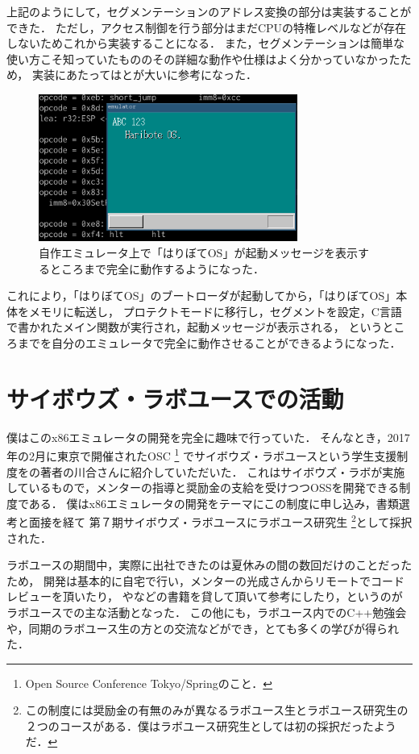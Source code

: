 \documentclass[10pt,a4j]{jsarticle}
\begin{document}
上記のようにして，セグメンテーションのアドレス変換の部分は実装することができた．
ただし，アクセス制御を行う部分はまだCPUの特権レベルなどが存在しないためこれから実装することになる．
また，セグメンテーションは簡単な使い方こそ知っていたもののその詳細な動作や仕様はよく分かっていなかったため，
実装にあたっては\cite[はじめて読む486]{read-486}と\cite[SDM]{SDM}が大いに参考になった．

\begin{figure}
	\vspace{-7mm}
	\caption{自作エミュレータ上で「はりぼてOS」が起動メッセージを表示するところまで完全に動作するようになった．}
	\includegraphics[width=85mm]{emu.png}
\end{figure}

これにより，「はりぼてOS」のブートローダが起動してから，「はりぼてOS」本体をメモリに転送し，
プロテクトモードに移行し，セグメントを設定，C言語で書かれたメイン関数が実行され，起動メッセージが表示される，
というところまでを自分のエミュレータで完全に動作させることができるようになった．

\section{サイボウズ・ラボユースでの活動}

僕はこのx86エミュレータの開発を完全に趣味で行っていた．
そんなとき，2017年の2月に東京で開催されたOSC
\footnote{Open Source Conference Tokyo/Springのこと．}
でサイボウズ・ラボユースという学生支援制度を\cite{30days-osdev}の著者の川合さんに紹介していただいた．
これはサイボウズ・ラボが実施しているもので，メンターの指導と奨励金の支給を受けつつOSSを開発できる制度である．
僕はx86エミュレータの開発をテーマにこの制度に申し込み，書類選考と面接を経て
第７期サイボウズ・ラボユースにラボユース研究生
\footnote{この制度には奨励金の有無のみが異なるラボユース生とラボユース研究生の２つのコースがある．僕はラボユース研究生としては初の採択だったようだ．}として採択された．

ラボユースの期間中，実際に出社できたのは夏休みの間の数回だけのことだったため，
開発は基本的に自宅で行い，メンターの光成さんからリモートでコードレビューを頂いたり，
\cite{read-486}や\cite{effective-cpp}などの書籍を貸して頂いて参考にしたり，というのがラボユースでの主な活動となった．
この他にも，ラボユース内でのC++勉強会や，同期のラボユース生の方との交流などができ，とても多くの学びが得られた．
\end{document}
